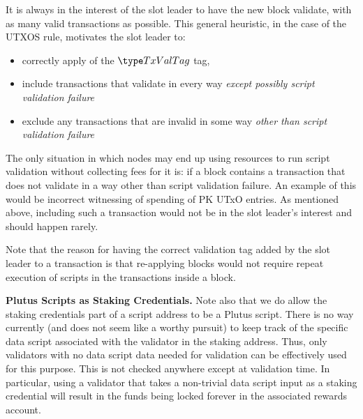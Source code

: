It is always in the interest of the slot leader to have the new block validate,
with as many valid transactions as possible. This general heuristic,
in the case of the UTXOS rule, motivates the
slot leader to:

\begin{itemize}
  \item correctly apply of the $\TxValTag$ tag,
  \item include transactions that validate in every way
  \textit{except possibly script validation failure}
  \item exclude any transactions that are invalid
in some way \textit{other than script validation failure}
\end{itemize}

The only situation in which nodes may end up using resources to run
script validation without collecting fees for it is: if a block contains
a transaction that does not validate in a way other than script validation
failure. An example of this would be incorrect witnessing of spending
of PK UTxO entries. As mentioned above, including such a transaction would not be
in the slot leader's interest and should happen rarely.

Note that the reason for having the correct validation tag added by the slot leader
to a transaction is that re-applying blocks would not require repeat
execution of scripts in the transactions inside a block.

\textbf{Plutus Scripts as Staking Credentials.}
Note also that we do allow the staking credentials part of a script
address to be a Plutus script. There is no way currently (and does not seem
like a worthy pursuit) to keep track of the specific data script associated with
the validator in the staking address. Thus, only validators with no
data script data needed for validation can be effectively used for this purpose.
This is not checked anywhere except at validation time. In particular,
using a validator that takes a non-trivial data script input as a staking credential
will result in the funds being locked forever in the associated rewards account.

